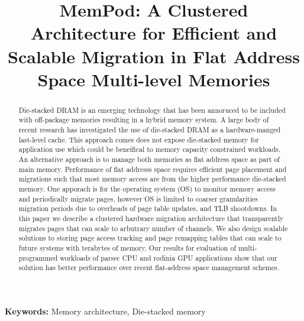\documentclass{sig-alternate}
\title {MemPod: A Clustered Architecture for Efficient and Scalable Migration in Flat Address Space Multi-level Memories}
\author{}
\newcommand{\TODO}[1]{\textcolor{red}{\todo{#1}}}
\begin{document}
\maketitle
\thispagestyle{firstpage}
\pagestyle{plain}

\begin{abstract}
  Die-stacked DRAM is an emerging technology that has been annoruced to be included with off-package memories resulting in a hybrid memory system. A large body of recent research has investigated the use of die-stacked DRAM as a hardware-manged last-level cache. This approach comes does not expose die-stacked memory for application use which could be beneifical to memory capacity constrained workloads. An alternative approach is to manage both memories as flat address space as part of main memory. Performance of flat addresss space requires efficient page placement and migrations such that most memory access are from the higher performance die-stacked memory. One apporach is for the operating system (OS) to monitor memory access and periodically migrate pages, however OS is limited to coarser granularities migration periods due to overheads of page table updates, and TLB shootdowns. In this paper we describe a clustered hardware migration architecture that transparently migrates pages that can scale to arbutrary number of channels. We also design scalable solutions to storing page access tracking and page remapping tables that can scale to future systems with terabytes of memory. Our results for evaluation of  multi-programmed workloads of parsec CPU and rodinia GPU applications show that our solution has \TODO{XX\%} better performance over recent flat-address space management schemes.
\end{abstract}

\noindent \textbf{Keywords:} Memory architecture, Die-stacked memory










\end{document}
